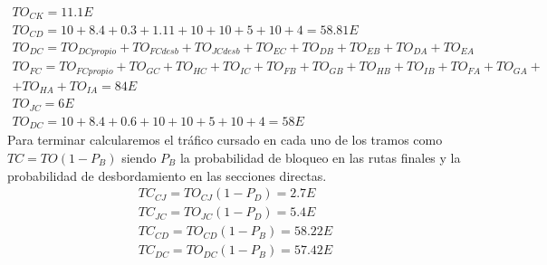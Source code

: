 \begin{exercise}[9]
\begin{gather*}
TO_{CK}=11.1E\\
TO_{CD}=10+8.4+0.3+1.11+10+10+5+10+4=58.81E\\
TO_{DC}=TO_{DCpropio}+TO_{FCdesb}+TO_{JCdesb}+TO_{EC}+TO_{DB}+TO_{EB}+TO_{DA}+TO_{EA}\\
TO_{FC}=TO_{FCpropio}+TO_{GC}+TO_{HC}+TO_{IC}+TO_{FB}+TO_{GB}+TO_{HB}+TO_{IB}+TO_{FA}+TO_{GA}+\\
+TO_{HA}+TO_{IA}=84E\\
TO_{JC}=6E\\
TO_{DC}=10+8.4+0.6+10+10+5+10+4=58E
\end{gather*}
Para terminar calcularemos el tráfico cursado en cada uno de los tramos como $TC=TO(1-P_B)$ siendo $P_B$ la probabilidad de bloqueo en las rutas finales y la probabilidad de desbordamiento en las secciones directas.
\begin{gather*}
TC_{CJ}=TO_{CJ}(1-P_D)=2.7E\\
TC_{JC}=TO_{JC}(1-P_D)=5.4E\\
TC_{CD}=TO_{CD}(1-P_B)=58.22E\\
TC_{DC}=TO_{DC}(1-P_B)=57.42E
\end{gather*}
\end{exercise}
